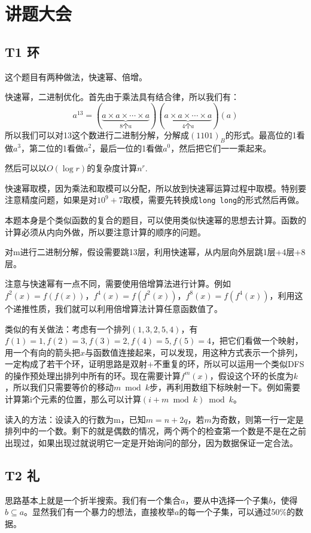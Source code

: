 \documentclass{article}
\begin{document}
\section{讲题大会}
\subsection{T1 环}
这个题目有两种做法，快速幂、倍增。

快速幂，二进制优化。首先由于乘法具有结合律，所以我们有：
\begin{equation*}
    a^{13}=(\underbrace{a\times a\times\cdots\times a}_{8个a})(\underbrace{a\times a\times\cdots\times a}_{4个a})(a)
\end{equation*}
所以我们可以对13这个数进行二进制分解，分解成$(1101)_B$的形式。最高位的1看做$a^3$，第二位的1看做$a^2$，最后一位的1看做$a^0$，然后把它们一一乘起来。

然后可以以$O(\log r)$的复杂度计算$n^r$.

快速幂取模，因为乘法和取模可以分配，所以放到快速幂运算过程中取模。特别要注意精度问题，如果是对$10^9+7$取模，需要先转换成\verb+long long+的形式然后再做。

本题本身是个类似函数的复合的题目，可以使用类似快速幂的思想去计算。函数的计算必须从内向外做，所以要注意计算的顺序的问题。

对m进行二进制分解，假设需要跳13层，利用快速幂，从内层向外层跳1层+4层+8层。

注意与快速幂有一点不同，需要使用倍增算法进行计算。例如$f^2(x)=f(f(x))$，$f^4(x)=f(f^2(x))$，$f^8(x)=f(f^4(x))$，利用这个递推性质，我们就可以利用倍增算法计算任意函数值了。

类似的有关做法：考虑有一个排列$(1,3,2,5,4)$，有$f(1)=1,f(2)=3,f(3)=2,f(4)=5,f(5)=4$，把它们看做一个映射，用一个有向的箭头把$x$与函数值连接起来，可以发现，用这种方式表示一个排列，一定构成了若干个环，证明思路是双射+不重复的环，所以可以运用一个类似DFS的操作预处理出排列中所有的环。现在需要计算$f^m(x)$，假设这个环的长度为$k$，所以我们只需要等价的移动$m\bmod k$步，再利用数组下标映射一下。例如需要计算第i个元素的位置，那么可以计算$(i+m\bmod k)\bmod k$。

读入的方法：设读入的行数为m，已知$m=n+2q$，若$m$为奇数，则第一行一定是排列中的一个数。剩下的就是偶数的情况，两个两个的检查第一个数是不是在之前出现过，如果出现过就说明它一定是开始询问的部分，因为数据保证一定合法。
\subsection{T2 礼}
思路基本上就是一个折半搜索。我们有一个集合$a$，要从中选择一个子集$b$，使得$b\subseteq a$。显然我们有一个暴力的想法，直接枚举$a$的每一个子集，可以通过50\%的数据。
\end{document}
